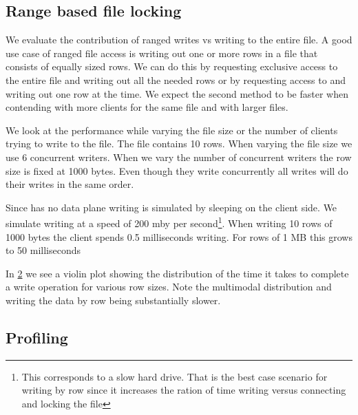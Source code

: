 \begin{figure}[htbp]
	\centering
	
	\caption{}
	\label{fig:touch_vs_time}
\end{figure}

\clearpage{}
\subsection{Range based file locking}
We evaluate the contribution of ranged writes vs writing to the entire file. A good use case of ranged file access is writing out one or more rows in a file that consists of equally sized rows. We can do this by requesting exclusive access to the entire file and writing out all the needed rows or by requesting access to and writing out one row at the time. We expect the second method to be faster when contending with more clients for the same file and with larger files. 

We look at the performance while varying the file size or the number of clients trying to write to the file. The file contains 10 rows. When varying the file size we use 6 concurrent writers. When we vary the number of concurrent writers the row size is fixed at 1000 bytes. Even though they write concurrently all writes will do their writes in the same order. 

Since \name{} has no data plane writing is simulated by sleeping on the client side. We simulate writing at a speed of 200 \ac{mby} per second\footnote{This corresponds to a slow hard drive. That is the best case scenario for writing by row since it increases the ration of time writing versus connecting and locking the file}. When writing 10 rows of 1000 bytes the client spends 0.5 milliseconds writing. For rows of 1 MB this grows to 50 milliseconds

In \cref{fig:rowlen} we see a violin plot showing the distribution of the time it takes to complete a write operation for various row sizes. Note the multimodal distribution and writing the data by row being substantially slower.


\begin{figure}[htbp]
	\centering
	
	\caption{}
	\label{fig:rowlen}
\end{figure}%

\begin{figure}[htbp]
	\centering
	
	\caption{}
	\label{fig:}
\end{figure}

\begin{figure}[htbp]
	\centering
	
	\caption{}
	\label{fig:}
\end{figure}

\subsection{Profiling} \label{sec:profile}
